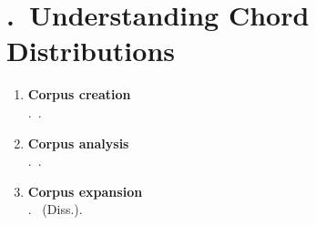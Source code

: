 \section{\thesection.~Understanding Chord Distributions}


\begin{frame}{\insertsectionhead}
  \begin{enumerate}
    \item<1-> \textbf{Corpus creation}\\ \citet{Neuwirth2018}.~.
    \item<2-> \textbf{Corpus analysis}\\\citet{Moss2019b}.~.
    \item<3-> \textbf{Corpus expansion}\\ \citet{Moss2019a}.~ (Diss.).
  \end{enumerate}
\end{frame}

